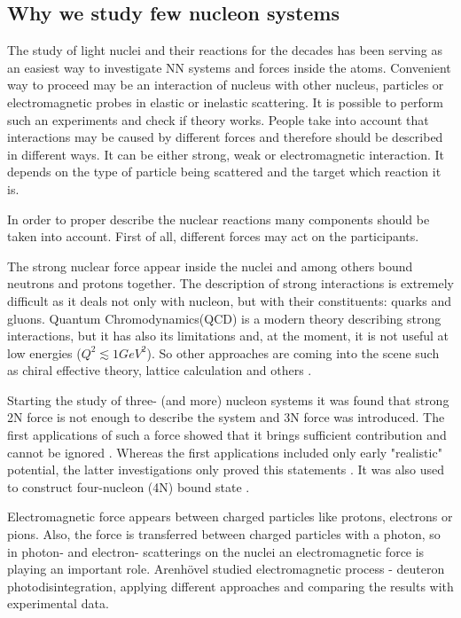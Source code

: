 \subsection*{Why we study few nucleon systems}

The study of light nuclei and their reactions for the decades has been serving as an easiest way
to investigate NN systems and forces inside the atoms. 
Convenient way to proceed may be an interaction of nucleus with
other nucleus, particles or electromagnetic probes in elastic or inelastic scattering.
It is possible to perform such an experiments and check if theory works.
People take into account that interactions may be caused by different forces
and therefore should be described in different ways. It can be
either strong, weak or electromagnetic interaction. It depends
on the type of particle being scattered and the target which reaction it is.

In order to proper describe the nuclear reactions many
components should be taken into account.
First of all, different forces may act on
the participants.


The strong nuclear force appear inside the nuclei and among others bound neutrons 
and protons together. The description of strong interactions is extremely
difficult as it deals not only with nucleon, but with their constituents: quarks
and gluons. Quantum Chromodynamics(QCD) is a modern theory
describing strong interactions, but it has also its limitations and, at the moment,
it is not useful at low energies ($Q^2 \lesssim 1 GeV^2$).
So other approaches are coming into the scene such as 
chiral effective theory, lattice calculation and others \cite{IOFFE2006232}.

Starting the study of three- (and more) nucleon systems it was found that 
strong 2N force is not enough to describe
the system and 3N force was introduced. The first applications of such
a force showed that it brings sufficient contribution and cannot be ignored \cite{GLOCKLE1982343}.
Whereas the first applications included only early "realistic" potential, the latter
investigations only proved this statements \cite{StoksPhysRevC49, WIRINGAPhysRevC51}.
It was also used to construct four-nucleon (4N) bound state \cite{NoggaPhysRevLett}.

Electromagnetic force appears between charged particles like protons, electrons or pions.
Also, the force is transferred between charged particles with a photon, so 
in photon- and electron- scatterings on the nuclei an electromagnetic
force is playing an important role. Arenh\"{o}vel \cite{ArenhovelPhotodisint1991} 
studied electromagnetic process - deuteron photodisintegration,
applying different approaches and comparing the results with
experimental data.

